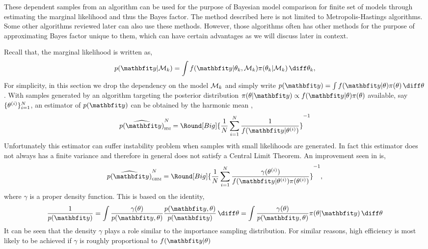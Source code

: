 These dependent samples from an \mcmc algorithm can be used for the purpose of
Bayesian model comparison for finite set of models through estimating the
marginal likelihood and thus the Bayes factor. The method described here is
not limited to Metropolis-Hastings algorithms. Some other algorithms reviewed
later can also use these methods. However, those algorithms often has other
methods for the purpose of approximating Bayes factor unique to them, which
can have certain advantages as we will discuss later in context.

Recall that, the marginal likelihood is written as,
\begin{equation*}
  p(\data|\calM_k) = \int
  f(\data|\theta_k,\calM_k)\pi(\theta_k|\calM_k)\intd\theta_k,
\end{equation*}
For simplicity, in this section we drop the dependency on the model $\mathcal{M}_k$
and simply write $p(\data) = \int f(\data|\theta)\pi(\theta)\intd\theta$.
With samples generated by an \mcmc algorithm targeting the posterior
distribution $\pi(\theta|\data) \propto f(\data|\theta) \pi(\theta)$
available, say $\{\theta^{(i)}\}_{i=1}^N$, an estimator of $p(\data)$ can be
obtained by the harmonic mean \cite{Newton:1994wm},
\begin{equation}
  \widehat{p(\data)}_{\text{\textsc{hm}}}^N =
  \Round[Big]{\frac{1}{N}\sum_{i=1}^N\frac{1}{f(\data|\supi\theta)}}^{-1}
\end{equation}
Unfortunately this estimator can suffer instability problem when samples with
small likelihoods are generated. In fact this estimator does not always has a
finite variance and therefore in general does not satisfy a Central Limit
Theorem. An improvement seen in \cite{Kass:1995vb} is,
\begin{equation}
  \widehat{p(\data)}_{\text{\textsc{ghm}}}^N = \Round[Big]{
    \frac{1}{N}\sum_{i=1}^N
    \frac{\gamma(\supi\theta)}{f(\data|\supi\theta)\pi(\supi\theta)}}^{-1},
\end{equation}
where $\gamma$ is a proper density function. This is based on the identity,
\begin{equation}
  \frac{1}{p(\data)}
  = \int \frac{\gamma(\theta)}{p(\data,\theta)}
  \frac{p(\data,\theta)}{p(\data)} \intd \theta
  = \int \frac{\gamma(\theta)}{p(\data,\theta)} \pi(\theta|\data) \intd \theta
\end{equation}
It can be seen that the density $\gamma$ plays a role similar to the
importance sampling distribution. For similar reasons, high efficiency is most
likely to be achieved if $\gamma$ is roughly proportional to $f(\data|\theta)$
